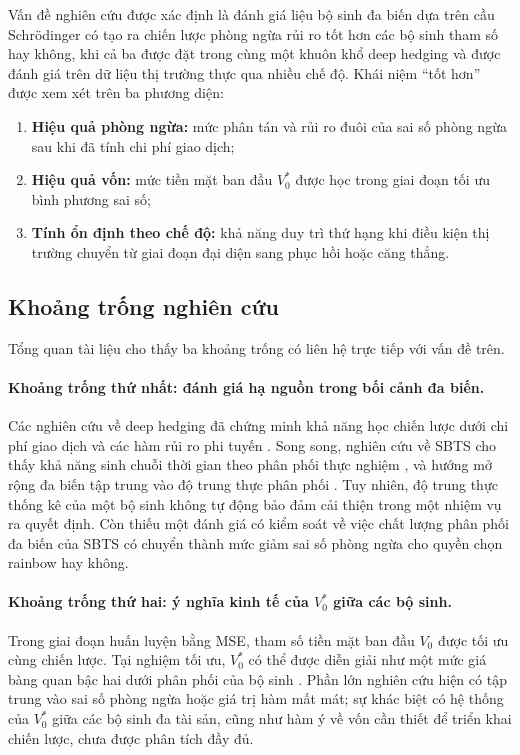 Vấn đề nghiên cứu được xác định là đánh giá liệu bộ sinh đa biến dựa trên cầu
Schrödinger có tạo ra chiến lược phòng ngừa rủi ro tốt hơn các bộ sinh tham số
hay không, khi cả ba được đặt trong cùng một khuôn khổ deep hedging và được
đánh giá trên dữ liệu thị trường thực qua nhiều chế độ. Khái niệm ``tốt hơn''
được xem xét trên ba phương diện:

\begin{enumerate}
    \item \textbf{Hiệu quả phòng ngừa:} mức phân tán và rủi ro đuôi của sai số
    phòng ngừa sau khi đã tính chi phí giao dịch;
    \item \textbf{Hiệu quả vốn:} mức tiền mặt ban đầu $V_0^{*}$ được học trong
    giai đoạn tối ưu bình phương sai số;
    \item \textbf{Tính ổn định theo chế độ:} khả năng duy trì thứ hạng khi điều
    kiện thị trường chuyển từ giai đoạn đại diện sang phục hồi hoặc căng thẳng.
\end{enumerate}

\subsection{Khoảng trống nghiên cứu}
\label{subsec:khoang-trong-nghien-cuu}

Tổng quan tài liệu cho thấy ba khoảng trống có liên hệ trực tiếp với vấn đề
trên.

\paragraph{Khoảng trống thứ nhất: đánh giá hạ nguồn trong bối cảnh đa biến.}
Các nghiên cứu về deep hedging đã chứng minh khả năng học chiến lược dưới chi
phí giao dịch và các hàm rủi ro phi tuyến \parencite{Buehler2019}. Song song,
nghiên cứu về \textsc{SBTS} cho thấy khả năng sinh chuỗi thời gian theo phân
phối thực nghiệm \parencite{Hamdouche2023}, và hướng mở rộng đa biến tập trung
vào độ trung thực phân phối \parencite{Alouadi2025}. Tuy nhiên, độ trung thực
thống kê của một bộ sinh không tự động bảo đảm cải thiện trong một nhiệm vụ ra
quyết định. Còn thiếu một đánh giá có kiểm soát về việc chất lượng phân phối đa
biến của \textsc{SBTS} có chuyển thành mức giảm sai số phòng ngừa cho quyền
chọn rainbow hay không.

\paragraph{Khoảng trống thứ hai: ý nghĩa kinh tế của $V_0^{*}$ giữa các bộ
sinh.}
Trong giai đoạn huấn luyện bằng MSE, tham số tiền mặt ban đầu $V_0$ được tối ưu
cùng chiến lược. Tại nghiệm tối ưu, $V_0^{*}$ có thể được diễn giải như một mức
giá bàng quan bậc hai dưới phân phối của bộ sinh
\parencite{FollmerSondermann1986,Schweizer2010}. Phần lớn nghiên cứu hiện có
tập trung vào sai số phòng ngừa hoặc giá trị hàm mất mát; sự khác biệt có hệ
thống của $V_0^{*}$ giữa các bộ sinh đa tài sản, cũng như hàm ý về vốn cần thiết
để triển khai chiến lược, chưa được phân tích đầy đủ.


